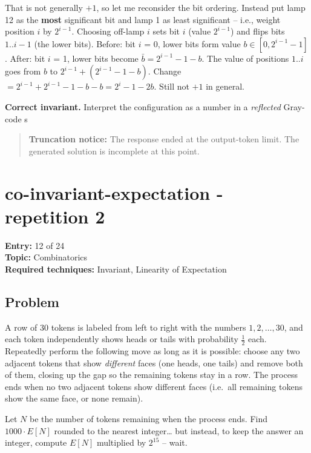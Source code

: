 \documentclass[
  11pt,
  letterpaper,
]{article}
\begin{document}
That is not generally \(+1\), so let me reconsider the bit ordering.
Instead put lamp 12 as the \textbf{most} significant bit and lamp 1 as
least significant -- i.e., weight position \(i\) by \(2^{i-1}\).
Choosing off-lamp \(i\) sets bit \(i\) (value \(2^{i-1}\)) and flips
bits \(1..i-1\) (the lower bits). Before: bit \(i\) = 0, lower bits form
value \(b \in [0, 2^{i-1}-1]\). After: bit \(i\) = 1, lower bits become
\(\bar b = 2^{i-1}-1-b\). The value of positions \(1..i\) goes from
\(b\) to \(2^{i-1} + (2^{i-1}-1-b)\). Change
\(= 2^{i-1} + 2^{i-1}-1-b - b = 2^{i} - 1 - 2b\). Still not \(+1\) in
general.

\textbf{Correct invariant.} Interpret the configuration as a number in a
\emph{reflected} Gray-code s

\begin{quote}
\textbf{Truncation notice:} The response ended at the output-token
limit. The generated solution is incomplete at this point.
\end{quote}

\clearpage

\section{co-invariant-expectation - repetition
2}\label{co-invariant-expectation---repetition-2}

\textbf{Entry:} 12 of 24\\
\textbf{Topic:} Combinatorics\\
\textbf{Required techniques:} Invariant, Linearity of Expectation

\subsection{Problem}\label{problem-11}

A row of 30 tokens is labeled from left to right with the numbers
\(1,2,\dots,30\), and each token independently shows heads or tails with
probability \(\tfrac12\) each. Repeatedly perform the following move as
long as it is possible: choose any two adjacent tokens that show
\emph{different} faces (one heads, one tails) and remove both of them,
closing up the gap so the remaining tokens stay in a row. The process
ends when no two adjacent tokens show different faces (i.e.~all
remaining tokens show the same face, or none remain).

Let \(N\) be the number of tokens remaining when the process ends. Find
\(1000\cdot E[N]\) rounded to the nearest integer\ldots{} but instead,
to keep the answer an integer, compute \(E[N]\) multiplied by \(2^{15}\)
-- wait.
\end{document}

